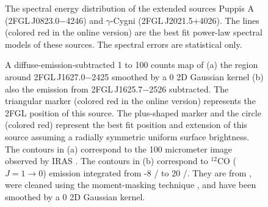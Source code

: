 \documentclass[12pt,preprint]{aastex}
\newif\ifcolorfigure
\newcommand{\gev}{\text{GeV}\xspace}
\newcommand{\s}{\text{s}\xspace}
\newcommand{\km}{\text{km}\xspace}
\begin{document}
\clearpage
\begin{figure}
    \ifcolorfigure
      \plotone{summary_plots/snr_seds_color.eps}
    \else
    \fi
    \caption{
    The spectral energy distribution of the extended sources 
    Puppis A (2FGL\,J0823.0$-$4246) and $\gamma$-Cygni 
    (2FGL\,J2021.5+4026).
    The lines (colored red in the online version)
    are the best fit power-law spectral models of
    these sources.
    The spectral errors are statistical only.
    }
    \label{snr_seds}
  \end{figure}

\begin{figure}
    \ifcolorfigure
      \plotone{source_plots/source_Ophiuchus_color.eps}
    \else
    \fi
  \caption{
  A diffuse-emission-subtracted 1 \gev to 100 \gev counts map of (a) the region
  around 2FGL\,J1627.0$-$2425 smoothed by a 0 2D Gaussian kernel (b)
  also the emission from 2FGL\,J1625.7$-$2526
  subtracted.  The triangular marker 
  (colored red in the
  online version) represents the 2FGL position of this source.
  The plus-shaped marker and the circle (colored red) 
  represent the best fit position and extension of this
  source assuming a radially symmetric uniform surface brightness. The
  contours in (a) correspond to the 100 micrometer image observed by
  IRAS \citep{iras_rho_ophiuci}.  The contours in (b) correspond to
  ${}^{12}\text{CO}$ ($J=1\rightarrow 0$) emission integrated from -8 \km/\s
  to 20 \km/\s.  They are from \cite{co_rho_ophiuci}, were cleaned using
  the moment-masking technique \citep{masking_moment_2011}, and have
  been smoothed by a 0 2D Gaussian kernel.
  }\label{1FGL_J1628.6-2419c}
\end{figure}
\end{document}
